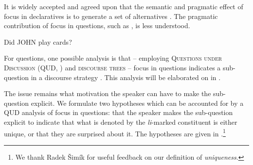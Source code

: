\documentclass[output=paper,
colorlinks,
citecolor=brown,
newtxmath
]{langscibook}
\begin{document}
It is widely accepted and agreed upon that the semantic and pragmatic effect of focus in declaratives is to generate a set of alternatives \citep{rooth1992}.  The pragmatic contribution of focus in questions, such as , is less understood.



\ea Did JOHN play cards? \label{didjohn}
\z


\noindent
For questions, one possible analysis is that -- employing \textsc{Questions under Discussion} (QUD, \citealt{Roberts2012}) and \textsc{discourse trees} \citep{Buering2003} -- focus in questions indicates a sub-question in a discourse strategy \citep{biezma2009, kamali.buering2011}. This analysis will be elaborated on in .


The issue remains what motivation the speaker can have to make the sub-question explicit.
We formulate two hypotheses which can be accounted for by a QUD analysis of focus in questions: that the speaker makes the sub-question explicit to indicate that what is denoted by the \textit{li}-marked constituent is either unique, or that they are surprised about it. The hypotheses are given in .\footnote{We thank Radek Šimík for useful feedback on our definition of \textit{uniqueness}.}
\end{document}
